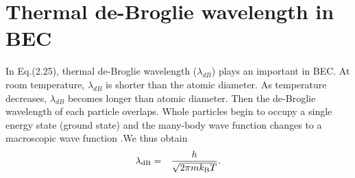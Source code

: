 \documentclass[12pt,a4paper]{report} %
\newcommand{\kb} {k_{\rm B}}				%
\begin{document}
\section{Thermal de-Broglie wavelength in BEC}
In Eq.(2.25), thermal de-Broglie wavelength ($\lambda_{dB}$) plays an important in BEC.
At room temperature, $\lambda_{dB}$ is shorter than the atomic diameter.
As temperature decreases, $\lambda_{dB}$ becomes longer than atomic diameter.
Then the de-Broglie wavelength of each particle overlaps.
Whole particles begin to occupy a single energy state (ground state) and the many-body wave function
changes to a macroscopic wave function \cite{16}.We thus obtain
\begin{eqnarray}
\lambda_{\rm dB} & = & \frac{h}{\sqrt{2 \pi m \kb T}}.
\end{eqnarray}
\end{document}
